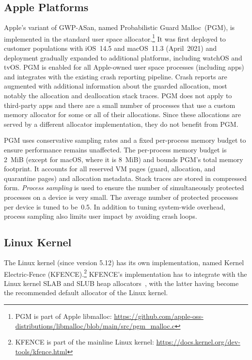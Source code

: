 \subsection{Apple Platforms}

Apple's variant of GWP-ASan, named Probabilistic Guard Malloc~(PGM), is
implemented in the standard user space allocator.\footnote{PGM is part of Apple
libmalloc:
\url{https://github.com/apple-oss-distributions/libmalloc/blob/main/src/pgm\_malloc.c}}
It was first deployed to customer populations with iOS~14.5 and macOS~11.3
(April~2021) and deployment gradually expanded to additional platforms,
including watchOS and tvOS.  PGM is enabled for all Apple-owned user space
processes (including apps) and integrates with the existing crash reporting
pipeline.  Crash reports are augmented with additional information about the
guarded allocation, most notably the allocation and deallocation stack traces.
PGM does not apply to third-party apps and there are a small number of
processes that use a custom memory allocator for some or all of their
allocations.  Since these allocations are served by a different allocator
implementation, they do not benefit from PGM.

PGM uses conservative sampling rates and a fixed per-process memory budget to
ensure performance remains unaffected.  The per-process memory budget is 2~MiB
(except for macOS, where it is 8~MiB) and bounds PGM's total memory footprint.
It accounts for all reserved VM pages (guard, allocation, and quarantine pages)
and allocation metadata.  Stack traces are stored in compressed form.
\emph{Process sampling} is used to ensure the number of simultaneously
protected processes on a device is very small.  The average number of protected
processes per device is tuned to be~0.5.  In addition to tuning system-wide
overhead, process sampling also limits user impact by avoiding crash loops.

\subsection{Linux Kernel}

The Linux kernel (since version 5.12) has its own implementation, named Kernel
Electric-Fence (KFENCE).\footnote{KFENCE is part of the mainline Linux kernel:
\url{https://docs.kernel.org/dev-tools/kfence.html}} KFENCE's implementation
has to integrate with the Linux kernel SLAB and SLUB heap
allocators~\cite{SLUB}, with the latter having become the recommended default
allocator of the Linux kernel.

